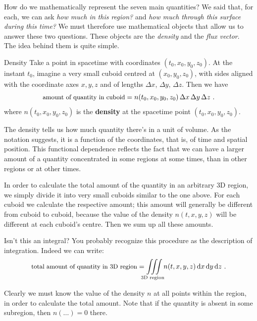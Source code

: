 \documentclass[a4paper,12pt,%
onecolumn,oneside,titlepage,%
british%
]{memoir}
\newcommand*{\di}{\mathrm{d}}%
\newcommand*{\incr}{\Delta}%
\renewcommand*{\|}[1][]{\nonscript\:#1\vert\nonscript\:\mathopen{}}
\newcommand*{\yto}{t_{0}}
\newcommand*{\yxo}{x_{0}}
\newcommand*{\yyo}{y_{0}}
\newcommand*{\yzo}{z_{0}}
\newcommand*{\Dx}{\incr x}
\newcommand*{\Dy}{\incr y}
\newcommand*{\Dz}{\incr z}
\begin{document}
How do we mathematically represent the seven main quantities? We said that, for each, we can ask \emph{how much in this region?} and \emph{how much through this surface during this time?} We must therefore use mathematical objects that allow us to answer these two questions. These objects are the \emph{density} and the \emph{flux vector}. The idea behind them is quite simple.


\begin{definition}{Density}
  Take a point in spacetime with coordinates $(\yto,\yxo,\yyo,\yzo)$. At the instant $\yto$, imagine a very small cuboid centred at $(\yxo,\yyo,\yzo)$, with sides aligned with the coordinate axes $x,y,z$ and of lengths $\Dx$, $\Dy$, $\Dz$. Then we have
  \begin{equation}
    \label{eq:density_expl}
    \text{\small amount of quantity in cuboid} = 
    n(\yto,\yxo,\yyo,\yzo)\, \Dx\, \Dy\, \Dz \ .
  \end{equation}
  where $n(\yto,\yxo,\yyo,\yzo)$ is the \textbf{density} at the spacetime point $(\yto,\yxo,\yyo,\yzo)$.
\end{definition}
The density tells us how much quantity there's in a unit of volume. As the notation suggests, it is a function of the coordinates, that is, of time and spatial position. This functional dependence reflects the fact that we can have a larger amount of a quantity concentrated in some regions at some times, than in other regions or at other times.

In order to calculate the total amount of the quantity in an arbitrary 3D region, we simply divide it into very small cuboids similar to the one above. For each cuboid we calculate the respective amount; this amount will generally be different from cuboid to cuboid, because the value of the density $n(t,x,y,z)$ will be different at each cuboid's centre. Then we sum up all these amounts.

\begin{extra}{Isn't this an integral?}
  You probably recognize this procedure as the description of integration. Indeed we can write:
  \begin{equation}
    \label{eq:density_integral}
    \text{\small total amount of quantity in 3D region} = 
    \iiint\limits_{\mathclap{\text{3D region}}}n(t,x,y,z)\, \di x\, \di y\, \di z \ .
  \end{equation}
\end{extra}
Clearly we must know the value of the density $n$ at all points within the region, in order to calculate the total amount. Note that if the quantity is absent in some subregion, then $n(\dotso)=0$ there.
\end{document}
